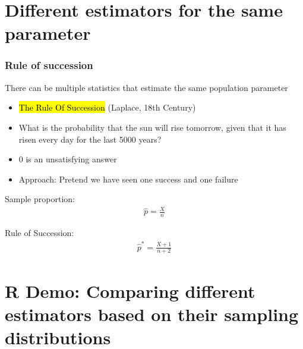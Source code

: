 \documentclass[t,compress,mathserif]{beamer}
\begin{document}

\section{Different estimators for the same parameter}


\begin{frame}
    \frametitle{Rule of succession}

    There can be multiple statistics that estimate the same population parameter
    \begin{itemize}

        \item \hl{The Rule Of Succession} (Laplace, 18th Century)
        \item What is the probability that the sun will rise tomorrow, given that it has risen every day for the last 5000 years?
        \item 0 is an unsatisfying answer
        \item Approach: Pretend we have seen one success and one failure
    
    \end{itemize}

    Sample proportion:
     \begin{align}
        \hat{p}=\frac{X}{n}
    \end{align}
 
    Rule of Succession:
    \begin{align}
        \hat{p}^*=\frac{X +1}{n+2}
    \end{align}
 
\end{frame}



\section{R Demo: Comparing different estimators based on their sampling distributions}
\end{document}
